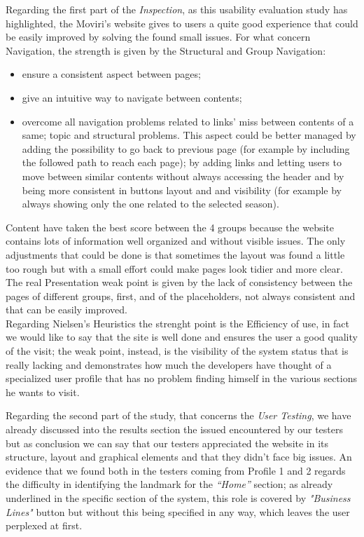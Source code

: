 Regarding the first part of the \textit{Inspection}, as this usability evaluation study has highlighted, the Moviri’s website gives to users a quite good experience that could be easily improved by solving the found small issues. 
For what concern Navigation, the strength is given by the Structural and Group Navigation:
\begin{itemize}
\item ensure a consistent aspect between pages; 
\item give an intuitive way to navigate between contents; 
\item overcome all navigation problems related to links’ miss between contents of a same; topic and structural problems. This aspect could be better managed by adding the possibility to go back to previous page (for example by including the followed path to reach each page); by adding links and letting users to move between similar contents without always accessing the header and by being more consistent in buttons layout and and visibility (for example by always showing only the one related to the selected season).
\end{itemize}
Content have taken the best score between the 4 groups because the website contains lots of information well organized and without visible issues. The only adjustments that could be done is that sometimes the layout was found a little too rough but with a small effort could make pages look tidier and more clear.\\
The real Presentation weak point is given by the lack of consistency between the pages of different groups, first, and of the placeholders, not always consistent and that can be easily improved.\\
Regarding Nielsen’s Heuristics the strenght point is the Efficiency of use, in fact we would like to say that the site is well done and ensures the user a good quality of the visit; the weak point, instead, is the visibility of the system status that is really lacking and demonstrates how much the developers have thought of a specialized user profile that has no problem finding himself in the various sections he wants to visit.
\par
Regarding the second part of the study, that concerns the \textit{User Testing}, we have already discussed into the results section the issued encountered by our testers but as conclusion we can say that our testers appreciated the website in its structure, layout and graphical elements and that they didn’t face big issues.
An evidence that we found both in the testers coming from Profile 1 and 2 regards the difficulty in identifying the landmark for the \textit{“Home”} section; as already underlined in the specific section of the system, this role is covered by \textit{"Business Lines"} button but without this being specified in any way, which leaves the user perplexed at first.
